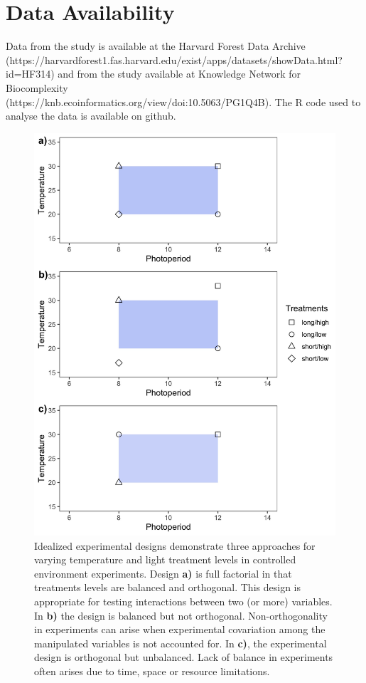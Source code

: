\documentclass[11pt]{article}
\begin{document}
\section*{Data Availability}
Data from the \cite{Flynn2018} study is available at the Harvard Forest Data Archive (https://harvardforest1.fas.harvard.edu/exist/apps/datasets/showData.html?id=HF314) and from the \citet{Buonaiuto:2021ug} study available at Knowledge Network for Biocomplexity\\ (https://knb.ecoinformatics.org/view/doi:10.5063/PG1Q4B). The R code used to analyse the data is available on github.



\begin{figure}[h!]
    \centering
 \includegraphics[width=.8\textwidth]{..//Plots/periodicity_figures/factorial.jpeg}
    \caption{Idealized experimental designs demonstrate three approaches for varying temperature and light treatment levels in controlled environment experiments. Design \textbf{a)} is full factorial in that treatments levels are balanced and orthogonal. This design is appropriate for testing interactions between two (or more) variables. In \textbf{b)} the design is balanced but not orthogonal. Non-orthogonality in experiments can arise when experimental covariation among the manipulated variables is not accounted for. In \textbf{c)}, the experimental design is orthogonal but unbalanced. Lack of balance in experiments often arises due to time, space or resource limitations. }
    \label{fig:examp}
\end{figure}
\end{document}
